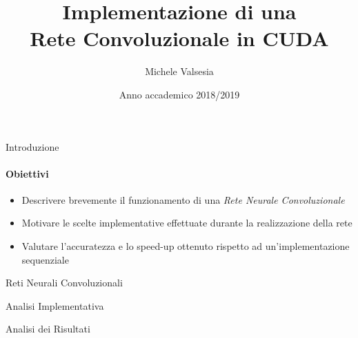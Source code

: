 \documentclass[
 ]{beamer}
\title{Implementazione di una \\ 
       Rete Convoluzionale in CUDA 
       \texorpdfstring{\bigskip}{Lg}
      }
\author{\hspace*{0.01em} {\Large Michele Valsesia} 
                         \texorpdfstring{\\ \bigskip}{Lg}
        \hspace*{-0.11em}{\Large Nicholas Aspes}
       }
\date{\Large Anno accademico 2018/2019}
\begin{document}
\maketitle



\begin{frame}{Introduzione}
    \framesubtitle{Obiettivi}  
    
    \begin{itemize} [<+->]
        \setlength\itemsep{2em}
        \item \large Descrivere brevemente il funzionamento di una \emph{Rete Neurale Convoluzionale}
        \item \large Motivare le scelte implementative effettuate durante la realizzazione della rete
        \item \large Valutare l'accuratezza e lo speed-up ottenuto rispetto ad un'implementazione sequenziale
       
    \end{itemize}  
\end{frame}


\begin{frame}[c]
  \centering
  \bigskip \bigskip    
  \Huge Reti Neurali Convoluzionali
\end{frame}

\begin{frame}[c]
  \centering
  \bigskip \bigskip    
  \Huge Analisi Implementativa
\end{frame}

\begin{frame}[c]
  \centering
  \bigskip \bigskip    
  \Huge Analisi dei Risultati
\end{frame}
\end{document}
